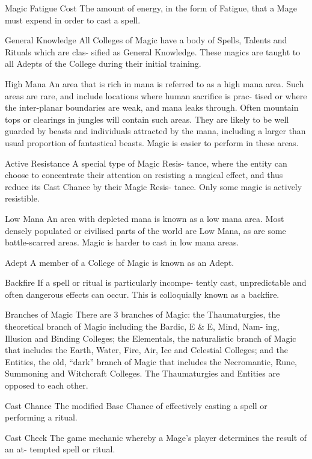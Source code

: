 \begin{Chapter}{Magic}
Fatigue Cost The amount of energy, in the form of 
Fatigue, that a Mage must expend in order to cast a 
spell. 

General Knowledge All Colleges of Magic have a 
body of Spells, Talents and Rituals which are clas-
sified  as  General  Knowledge.  These  magics  are 
taught  to  all  Adepts  of  the  College  during  their 
initial training. 

High Mana An area that is rich in mana is referred 
to  as  a  high  mana  area.  Such  areas  are  rare,  and 
include  locations  where  human  sacrifice  is  prac-
tised  or  where  the  inter-planar  boundaries  are 
weak,  and  mana  leaks  through.  Often  mountain 
tops or clearings in jungles will contain such areas. 
They  are  likely  to  be  well  guarded  by  beasts  and 
individuals  attracted  by  the  mana,  including  a 
larger  than  usual  proportion  of  fantastical  beasts. 
Magic is easier to perform in these areas. 

Active Resistance A special type of  Magic Resis-
tance,  where  the  entity  can  choose  to  concentrate 
their  attention  on  resisting  a  magical  effect,  and 
thus  reduce  its Cast  Chance by  their Magic  Resis-
tance. Only some magic is actively resistible. 

Low Mana An area with depleted mana is known 
as  a  low  mana  area.  Most  densely  populated  or 
civilised  parts  of  the  world  are  Low  Mana,  as  are 
some  battle-scarred  areas.  Magic  is  harder  to  cast 
in low mana areas. 

Adept A member of a College of Magic is known 
as an Adept. 

Backfire If a spell or ritual is particularly incompe-
tently  cast,  unpredictable  and  often  dangerous 
effects  can  occur.  This  is  colloquially  known  as  a 
backfire. 

Branches of Magic There are 3 branches of Magic: the Thaumaturgies,
the theoretical branch of Magic including the Bardic, E \& E, Mind,
Nam- ing, Illusion and Binding Colleges; the Elementals, the
naturalistic branch of Magic that includes the Earth, Water, Fire,
Air, Ice and Celestial Colleges; and the Entities, the old, “dark”
branch of Magic that includes the Necromantic, Rune, Summoning and
Witchcraft Colleges.  The Thaumaturgies and Entities are opposed to
each other.

Cast Chance The modified Base Chance of effectively casting a spell or
performing a ritual.

Cast  Check  The  game  mechanic  whereby  a 
Mage’s  player  determines  the  result  of  an  at-
tempted spell or ritual. 


\end{Chapter}
